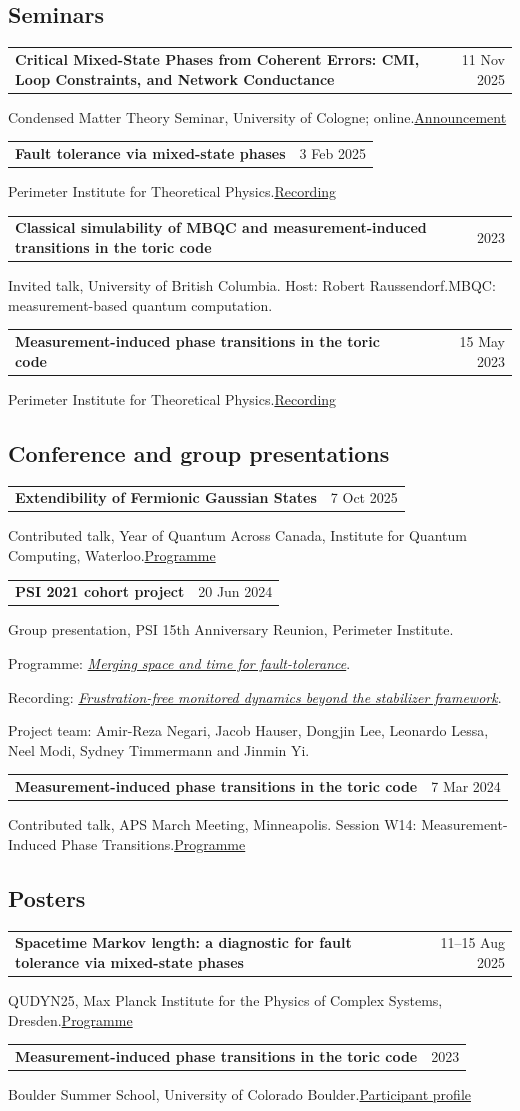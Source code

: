 \documentclass[10pt,letterpaper]{article}
\makeatletter
\newcommand{\dated}[2]{\par\begin{tabularx}{\linewidth}{@{}>{\raggedright\arraybackslash}X@{\hspace{12pt}}r@{}}#1 & \textcolor{muted}{#2}\\\end{tabularx}\par}
\newcommand{\talk}[4]{\par\begin{minipage}[t]{\linewidth}\raggedright\dated{\textbf{#1}}{#2}#3\ifhmode\enspace\fi#4\end{minipage}\par\vspace{5pt}}
\makeatother
\begin{document}
\subsection{Seminars}
\talk{Critical Mixed-State Phases from Coherent Errors: CMI, Loop Constraints, and Network Conductance}{11 Nov 2025}
{Condensed Matter Theory Seminar, University of Cologne; online.}
{\href{https://events.thp.uni-koeln.de/events/2286}{Announcement}}
\talk{Fault tolerance via mixed-state phases}{3 Feb 2025}
{Perimeter Institute for Theoretical Physics.}
{\href{https://pirsa.org/25020056}{Recording}}
\talk{Classical simulability of MBQC and measurement-induced transitions in the toric code}{2023}
{Invited talk, University of British Columbia. Host: Robert Raussendorf.}
{MBQC: measurement-based quantum computation.}
\talk{Measurement-induced phase transitions in the toric code}{15 May 2023}
{Perimeter Institute for Theoretical Physics.}
{\href{https://pirsa.org/23050143}{Recording}}

\Needspace{85pt}
\subsection{Conference and group presentations}
\talk{Extendibility of Fermionic Gaussian States}{7 Oct 2025}
{Contributed talk, Year of Quantum Across Canada, Institute for Quantum Computing, Waterloo.}
{\href{https://events.perimeterinstitute.ca/event/1107/contributions/2011/}{Programme}}
\talk{PSI 2021 cohort project}{20 Jun 2024}
{Group presentation, PSI 15th Anniversary Reunion, Perimeter Institute.\par}
{Programme: \href{https://events.perimeterinstitute.ca/event/72/contributions/1154/}{\textit{Merging space and time for fault-tolerance}}.\par
Recording: \href{https://pirsa.org/24060009}{\textit{Frustration-free monitored dynamics beyond the stabilizer framework}}.\par
Project team: Amir-Reza Negari, Jacob Hauser, Dongjin Lee, Leonardo Lessa, Neel Modi, Sydney Timmermann and Jinmin Yi.}
\talk{Measurement-induced phase transitions in the toric code}{7 Mar 2024}
{Contributed talk, APS March Meeting, Minneapolis. Session W14: Measurement-Induced Phase Transitions.}
{\href{https://meetings.aps.org/Meeting/MAR24/Session/W14.5}{Programme}}

\Needspace{85pt}
\subsection{Posters}
\talk{Spacetime Markov length: a diagnostic for fault tolerance via mixed-state phases}{11--15 Aug 2025}
{QUDYN25, Max Planck Institute for the Physics of Complex Systems, Dresden.}
{\href{https://www.pks.mpg.de/qudyn25/poster-contributions}{Programme}}
\talk{Measurement-induced phase transitions in the toric code}{2023}
{Boulder Summer School, University of Colorado Boulder.}
{\href{https://www.colorado.edu/conference/bss/amirreza-negari}{Participant profile}}
\end{document}
